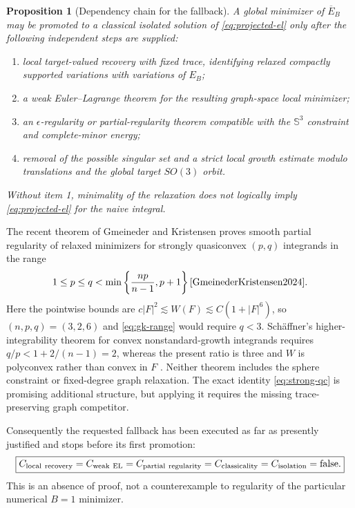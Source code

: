 \documentclass[11pt]{article}
\newtheorem{proposition}[theorem]{Proposition}
\begin{document}
\begin{proposition}[Dependency chain for the fallback]
A global minimizer of $\overline E_B$ may be promoted to a classical isolated
solution of \eqref{eq:projected-el} only after the following independent
steps are supplied:
\begin{enumerate}
 \item local target-valued recovery with fixed trace, identifying relaxed
       compactly supported variations with variations of $E_B$;
 \item a weak Euler--Lagrange theorem for the resulting graph-space local
       minimizer;
 \item an $\epsilon$-regularity or partial-regularity theorem compatible with
       the $\mathbb S^3$ constraint and complete-minor energy;
 \item removal of the possible singular set and a strict local growth
       estimate modulo translations and the global target $SO(3)$ orbit.
\end{enumerate}
Without item 1, minimality of the relaxation does not logically imply
\eqref{eq:projected-el} for the naive integral.
\end{proposition}

The recent theorem of Gmeineder and Kristensen proves smooth partial
regularity of relaxed minimizers for strongly quasiconvex $(p,q)$ integrands
in the range
\begin{equation}
 1\leq p\leq q<\min\left\{\frac{np}{n-1},p+1\right\}
 \cite{GmeinederKristensen2024}.
 \label{eq:gk-range}
\end{equation}
Here the pointwise bounds are $c|F|^2\lesssim W(F)\lesssim C(1+|F|^6)$, so
$(n,p,q)=(3,2,6)$ and \eqref{eq:gk-range} would require $q<3$.
Sch\"affner's higher-integrability theorem for convex nonstandard-growth
integrands requires $q/p<1+2/(n-1)=2$, whereas the present ratio is three
and $W$ is polyconvex rather than convex in $F$ \cite{Schaffner2021}.  Neither
theorem includes the sphere constraint or fixed-degree graph relaxation.
The exact identity \eqref{eq:strong-qc} is promising additional structure,
but applying it requires the missing trace-preserving graph competitor.

Consequently the requested fallback has been executed as far as presently
justified and stops before its first promotion:
\begin{equation}
 \boxed{C_{\rm local\ recovery}=C_{\rm weak\ EL}
 =C_{\rm partial\ regularity}=C_{\rm classicality}
 =C_{\rm isolation}=\mathrm{false}.}
 \label{eq:fallback-false}
\end{equation}
This is an absence of proof, not a counterexample to regularity of the
particular numerical $B=1$ minimizer.
\end{document}

